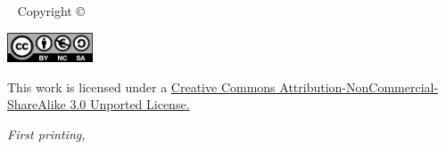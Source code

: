 \begin{fullwidth}
~\vfill
\thispagestyle{empty}
\setlength{\parindent}{0pt}
\setlength{\parskip}{\baselineskip}
Copyright \copyright\ \the\year\ \thanklessauthor


\leavevmode
\includegraphics[width=1in]{graphics/license.png}
\label{fig:cc}

\scriptsize{This work is licensed under a \href{http://creativecommons.org/licenses/by-nc-sa/3.0/deed.en_US}{Creative Commons Attribution-NonCommercial-ShareAlike 3.0 Unported License.}}


\par\textit{First printing, \monthyear}
\end{fullwidth} 
